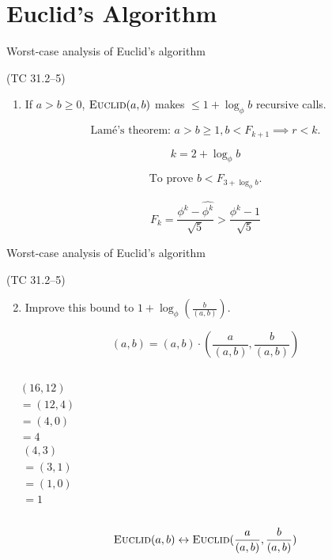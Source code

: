 \section{Euclid's Algorithm}

\begin{frame}{Worst-case analysis of Euclid's algorithm}
  \begin{exampleblock}{(TC 31.2--5)}
	\begin{enumerate}
	  \item If $a > b \ge 0$, $\textsc{Euclid}(a,b)$ makes $\le 1 + \log_{\phi}b$ recursive calls.
	\end{enumerate}
  \end{exampleblock}

  \pause
  \[
	\text{Lam\'{e}'s theorem: } a > b \ge 1, b < F_{k+1} \implies r < k.
  \]

  \pause
  \[
	k = 2 + \log_{\phi}b
  \]

  \pause
  \[
	\text{To prove } b < F_{3 + \log_{\phi}b}.
  \]

  \pause
  \[
	F_k = \frac{\phi^{k} - \hat{\phi^{k}}}{\sqrt{5}} > \frac{\phi^{k} - 1}{\sqrt{5}}
  \]
\end{frame}
\begin{frame}{Worst-case analysis of Euclid's algorithm}
  \begin{exampleblock}{(TC 31.2--5)}
	\begin{enumerate}
	  \setcounter{enumi}{1}
	  \item Improve this bound to $1 + \log_{\phi}(\frac{b}{(a,b)})$.
	\end{enumerate}
  \end{exampleblock}

  \pause
  \[
	(a,b) = (a,b) \cdot (\frac{a}{(a,b)}, \frac{b}{(a,b)})
  \]

  \vspace{-0.20cm}
  \begin{columns}
	  \pause
	  \begin{align*}
		&(16,12) \\
		&=(12,4) \\
		&=(4,0) \\
		&=4
	  \end{align*}
	  \pause
	  \begin{align*}
		&(4,3) \\
		&=(3,1) \\
		&=(1,0) \\
		&=1
	  \end{align*}
  \end{columns}
  
  \pause
  \[
	\textsc{Euclid}(a,b) \leftrightarrow \textsc{Euclid}(\frac{a}{(a,b)}, \frac{b}{(a,b)})
  \]
\end{frame}
